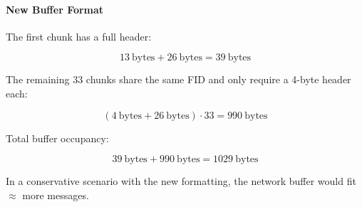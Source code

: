 \paragraph{New Buffer Format}

The first chunk has a full header:

\[
13~\text{bytes} + 26~\text{bytes} = 39~\text{bytes}
\]

The remaining 33 chunks share the same \ac{FID} and only require a 4-byte header each:

\[
(4~\text{bytes} + 26~\text{bytes}) \cdot 33 = 990~\text{bytes}
\]

Total buffer occupancy:

\[
39~\text{bytes} + 990~\text{bytes} = 1029~\text{bytes}
\]

In a conservative scenario with the new formatting, the network buffer would fit $\approx$ more messages.